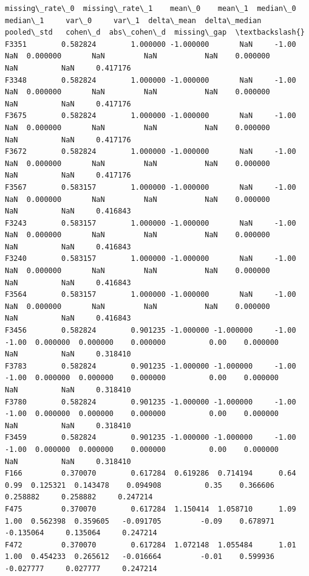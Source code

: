 \documentclass[11pt]{article}
\begin{document}
    
    \begin{Verbatim}[commandchars=\\\{\}]
       missing\_rate\_0  missing\_rate\_1    mean\_0    mean\_1  median\_0  median\_1     var\_0     var\_1  delta\_mean  delta\_median  pooled\_std   cohen\_d  abs\_cohen\_d  missing\_gap  \textbackslash{}
F3351        0.582824        1.000000 -1.000000       NaN     -1.00       NaN  0.000000       NaN         NaN           NaN    0.000000       NaN          NaN     0.417176   
F3348        0.582824        1.000000 -1.000000       NaN     -1.00       NaN  0.000000       NaN         NaN           NaN    0.000000       NaN          NaN     0.417176   
F3675        0.582824        1.000000 -1.000000       NaN     -1.00       NaN  0.000000       NaN         NaN           NaN    0.000000       NaN          NaN     0.417176   
F3672        0.582824        1.000000 -1.000000       NaN     -1.00       NaN  0.000000       NaN         NaN           NaN    0.000000       NaN          NaN     0.417176   
F3567        0.583157        1.000000 -1.000000       NaN     -1.00       NaN  0.000000       NaN         NaN           NaN    0.000000       NaN          NaN     0.416843   
F3243        0.583157        1.000000 -1.000000       NaN     -1.00       NaN  0.000000       NaN         NaN           NaN    0.000000       NaN          NaN     0.416843   
F3240        0.583157        1.000000 -1.000000       NaN     -1.00       NaN  0.000000       NaN         NaN           NaN    0.000000       NaN          NaN     0.416843   
F3564        0.583157        1.000000 -1.000000       NaN     -1.00       NaN  0.000000       NaN         NaN           NaN    0.000000       NaN          NaN     0.416843   
F3456        0.582824        0.901235 -1.000000 -1.000000     -1.00     -1.00  0.000000  0.000000    0.000000          0.00    0.000000       NaN          NaN     0.318410   
F3783        0.582824        0.901235 -1.000000 -1.000000     -1.00     -1.00  0.000000  0.000000    0.000000          0.00    0.000000       NaN          NaN     0.318410   
F3780        0.582824        0.901235 -1.000000 -1.000000     -1.00     -1.00  0.000000  0.000000    0.000000          0.00    0.000000       NaN          NaN     0.318410   
F3459        0.582824        0.901235 -1.000000 -1.000000     -1.00     -1.00  0.000000  0.000000    0.000000          0.00    0.000000       NaN          NaN     0.318410   
F166         0.370070        0.617284  0.619286  0.714194      0.64      0.99  0.125321  0.143478    0.094908          0.35    0.366606  0.258882     0.258882     0.247214   
F475         0.370070        0.617284  1.150414  1.058710      1.09      1.00  0.562398  0.359605   -0.091705         -0.09    0.678971 -0.135064     0.135064     0.247214   
F472         0.370070        0.617284  1.072148  1.055484      1.01      1.00  0.454233  0.265612   -0.016664         -0.01    0.599936 -0.027777     0.027777     0.247214   


\end{Verbatim}
\end{document}
